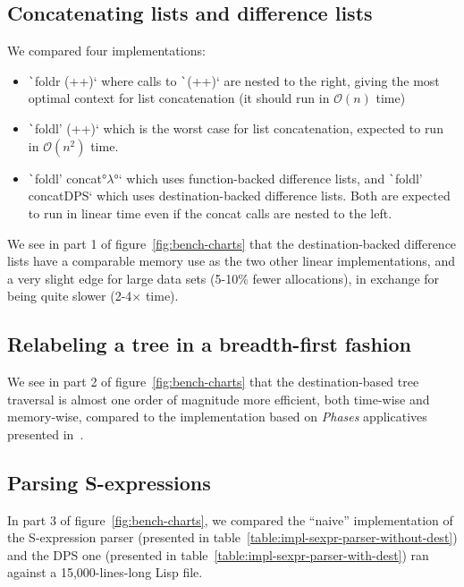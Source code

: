 \documentclass[english]{jflart}
\begin{document}
\subsection{Concatenating lists and difference lists}\label{ssec:benchmark-dlist}

We compared four implementations:
\begin{itemize}
\item \texttt`foldr (++)` where calls to \texttt`(++)` are nested to the right, giving the most optimal context for list concatenation (it should run in $\mathcal{O}(n)$ time)
\item \texttt`foldl' (++)` which is the worst case for list concatenation, expected to run in $\mathcal{O}(n^2)$ time.
\item \texttt`foldl' concat°$\lambda$°` which uses function-backed difference lists, and \texttt`foldl' concatDPS` which uses destination-backed difference lists. Both are expected to run in linear time even if the concat calls are nested to the left.
\end{itemize}

We see in part 1 of figure~\ref{fig:bench-charts} that the destination-backed difference lists have a comparable memory use as the two other linear implementations, and a very slight edge for large data sets (5-10\% fewer allocations), in exchange for being quite slower (2-4$\times$ time).


\subsection{Relabeling a tree in a breadth-first fashion}\label{ssec:benchmark-bf-tree-traversal}

We see in part 2 of figure~\ref{fig:bench-charts} that the destination-based tree traversal is almost one order of magnitude more efficient, both time-wise and memory-wise, compared to the implementation based on \emph{Phases} applicatives presented in~\cite{gibbons_phases_2023}.

\subsection{Parsing S-expressions}\label{ssec:benchmark-parser}

In part 3 of figure~\ref{fig:bench-charts}, we compared the ``naive'' implementation of the S-expression parser (presented in table~\ref{table:impl-sexpr-parser-without-dest}) and the DPS one (presented in table~\ref{table:impl-sexpr-parser-with-dest}) ran against a 15,000-lines-long Lisp file.
\end{document}
